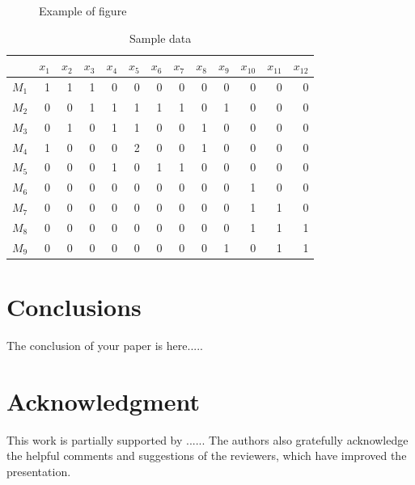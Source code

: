 \documentclass[12pt,a4paper]{icicel}
\begin{document}
\begin{figure}[htbp]
\begin{center}
\caption{Example of figure}
\label{fig1}
\end{center}
\end{figure}

\begin{table}[htbp]
	\caption{Sample data}
	\label{table1}
	\begin{center}
	\begin{tabular}{|l|r|r|r|r|r|r|r|r|r|r|r|r|} \hline
	& $x_1$ & $x_2$ & $x_3$ & $x_4$ & $x_5$ & $x_6$ & $x_7$ & $x_8$ & $x_9$ & $x_{10}$ & $x_{11}$ & $x_{12}$ \\ \hline
	$M_1$ & 1 & 1 & 1 & 0 & 0 & 0 & 0 & 0 & 0 & 0 & 0 & 0 \\
	$M_2$ & 0 & 0 & 1 & 1 & 1 & 1 & 1 & 0 & 1 & 0 & 0 & 0 \\
	$M_3$ & 0 & 1 & 0 & 1 & 1 & 0 & 0 & 1 & 0 & 0 & 0 & 0 \\
	$M_4$ & 1 & 0 & 0 & 0 & 2 & 0 & 0 & 1 & 0 & 0 & 0 & 0 \\
	$M_5$ & 0 & 0 & 0 & 1 & 0 & 1 & 1 & 0 & 0 & 0 & 0 & 0 \\
	$M_6$ & 0 & 0 & 0 & 0 & 0 & 0 & 0 & 0 & 0 & 1 & 0 & 0 \\
	$M_7$ & 0 & 0 & 0 & 0 & 0 & 0 & 0 & 0 & 0 & 1 & 1 & 0 \\
	$M_8$ & 0 & 0 & 0 & 0 & 0 & 0 & 0 & 0 & 0 & 1 & 1 & 1 \\
	$M_9$ & 0 & 0 & 0 & 0 & 0 & 0 & 0 & 0 & 1 & 0 & 1 & 1 \\ \hline
	\end{tabular}
	\end{center}
\end{table}

\section {Conclusions}

The conclusion of your paper is here.....

\section*{Acknowledgment}
This work is partially supported by ......
The authors also gratefully acknowledge the helpful comments and suggestions of the reviewers,
which have improved the presentation.



\end{document}
